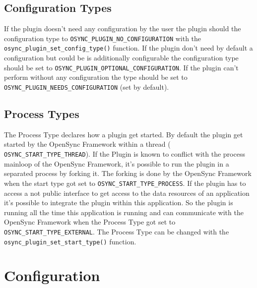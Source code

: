 \subsection{Configuration Types}
If the plugin doesn't need any configuration by the user the plugin should the
configuration type to \verb|OSYNC_PLUGIN_NO_CONFIGURATION| with the
\verb|osync_plugin_set_config_type()| function. If the plugin don't need by
default a configuration but could be is additionally configurable the
configuration type should be set to \verb|OSYNC_PLUGIN_OPTIONAL_CONFIGURATION|. 
If the plugin can't perform without any configuration the type should be set
to\\ \verb|OSYNC_PLUGIN_NEEDS_CONFIGURATION| (set by default).
\subsection{Process Types}
The Process Type declares how a plugin get started. By default the plugin get
started by the OpenSync Framework within a thread (
\verb|OSYNC_START_TYPE_THREAD|). If the Plugin is known to conflict with the 
process mainloop of the OpenSync Framework, it's possible to run the plugin in 
a separated process by forking it. The forking is done by the OpenSync
Framework when the start type got set to \verb|OSYNC_START_TYPE_PROCESS|. If the
plugin has to access a not public interface to get access to the data resources
of an application it's possible to integrate the plugin within this application.
So the plugin is running all the time this application is running and can
communicate with the OpenSync Framework when the Process Type got set to 
\verb|OSYNC_START_TYPE_EXTERNAL|. The Process Type can be changed with the 
\verb|osync_plugin_set_start_type()| function. 
\section{Configuration}
